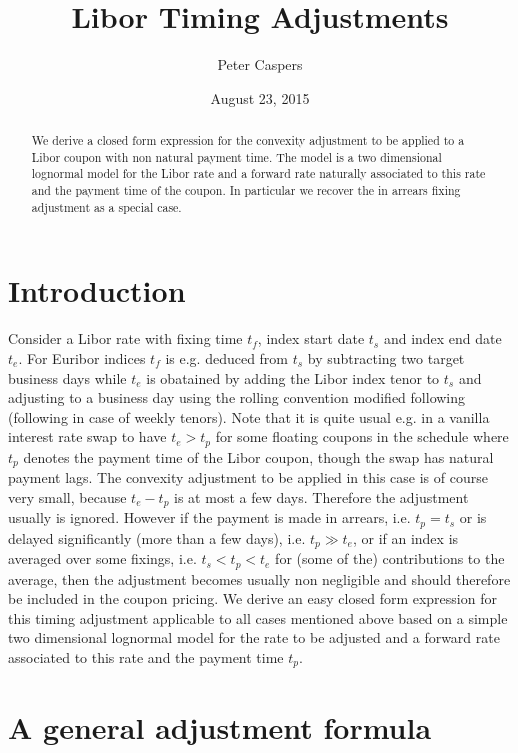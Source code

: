 \documentclass{amsart}
\theoremstyle{plain}
\numberwithin{equation}{section}
\begin{document}
\title[Libor Timing Adjustments]{Libor Timing Adjustments}
\author{Peter Caspers}
\date{August 23, 2015}
\begin{abstract}
We derive a closed form expression for the convexity adjustment to be applied to a Libor coupon with non natural
payment time. The model is a two dimensional lognormal model for the Libor rate and a forward rate
naturally associated to this rate and the payment time of the coupon. In particular we recover the in arrears
fixing adjustment as a special case.
\end{abstract}

\maketitle

\section{Introduction}

Consider a Libor rate with fixing time $t_f$, index start date $t_s$ and index end date $t_e$. For Euribor indices
$t_f$ is e.g. deduced from $t_s$ by subtracting two target business days while $t_e$ is obatained by adding
the Libor index tenor to $t_s$ and adjusting to a business day using the rolling convention modified following (following in case of weekly tenors).
Note that it is quite usual e.g. in a vanilla interest rate swap to have $t_e > t_p$ for some floating coupons in the schedule where $t_p$ denotes the payment
time of the Libor coupon, though the swap has natural payment lags. The convexity adjustment to be applied in this case
is of course very small, because $t_e - t_p$ is at most a few days. Therefore the adjustment usually is ignored. However
if the payment is made in arrears, i.e. $t_p = t_s$ or is delayed significantly (more than a few days), i.e. $t_p \gg t_e$, or if an index is
averaged over some fixings, i.e. $t_s < t_p < t_e$ for (some of the) contributions to the average, then the adjustment
becomes usually non negligible and should therefore be included in the coupon pricing. We derive an easy closed form expression for this timing adjustment
applicable to all cases mentioned above based on a simple two dimensional lognormal model for the rate to be adjusted and a forward rate associated
to this rate and the payment time $t_p$.

\section{A general adjustment formula}
\end{document}
